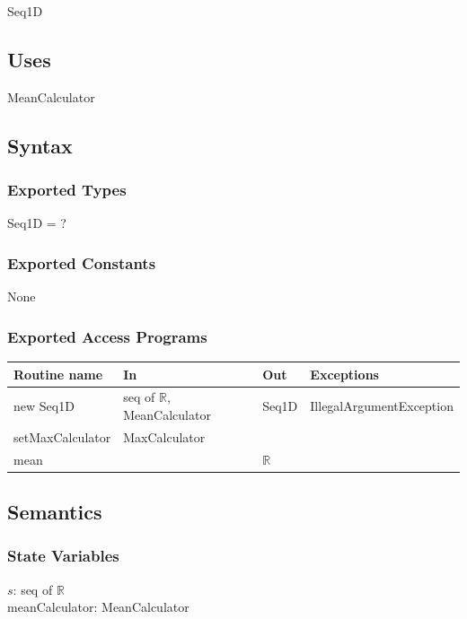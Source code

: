 \documentclass[12pt,fleqn]{examtst}
\begin{document}
Seq1D

\subsection* {Uses}

MeanCalculator

\subsection* {Syntax}

\subsubsection* {Exported Types}

Seq1D = ?

\subsubsection* {Exported Constants}

None

\subsubsection* {Exported Access Programs}

\begin{tabular}{| l | l | l | p{6cm} |}
\hline
\textbf{Routine name} & \textbf{In} & \textbf{Out} & \textbf{Exceptions}\\
\hline
new Seq1D & seq of $\mathbb{R}$, MeanCalculator & Seq1D & IllegalArgumentException\\
\hline
setMaxCalculator & MaxCalculator &  & \\
\hline
mean &  & $\mathbb{R}$ & \\
\hline

\end{tabular}

\subsection* {Semantics}

\subsubsection* {State Variables}

$s$: seq of $\mathbb{R}$\\
meanCalculator: MeanCalculator
\end{document}
